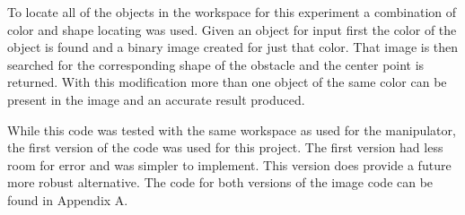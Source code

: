 To locate all of the objects in the workspace for this experiment a combination of color and shape locating was used. Given an object for input first the color of the object is found and a binary image created for just that color. That image is then searched for the corresponding shape of the obstacle and the center point is returned. With this modification more than one object of the same color can be present in the image and an accurate result produced. 

 While this code was tested with the same workspace as used for the manipulator, the first version of the code was used for this project. The first version had less room for error and was simpler to implement. This version does provide a future more robust alternative. The code for both versions of the image code can be found in Appendix A.
